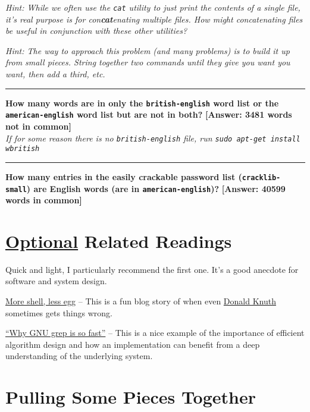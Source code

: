 \documentclass{article}
\begin{document}
\medskip
\noindent
\emph{\small Hint: While we often use the \texttt{cat} utility to just print
  the contents of a single file, it's real purpose is for con\textbf{cat}enating
  multiple files. How might concatenating files be useful in conjunction with
  these other utilities?
}

\medskip
\noindent
\emph{\small Hint: The way to approach this problem (and many problems) is to
  build it up from small pieces. String together two commands until they give
  you want you want, then add a third, etc.
}


\bigskip
\hrule
\smallskip
\noindent
\textbf{How many words are in only the \texttt{british-english} word list or
the \texttt{american-english} word list but are not in both?}
\hfill \textbf{[Answer: 3481 words not in common]}\\
\emph{\small If for some reason there is no \texttt{british-english} file, run
\texttt{sudo apt-get install wbritish}}
\vspace{3cm}

\hrule
\smallskip
\noindent
\textbf{How many entries in the easily crackable password list
  (\texttt{cracklib-small}) are English words (are in
\texttt{american-english})?}
\hfill \textbf{[Answer: 40599 words in common]}
\vspace{3cm}

\vfill
\section*{\ul{Optional} Related Readings}
Quick and light, I particularly recommend the first one. It's a good anecdote
for software and system design.

\medskip
\noindent
\href{http://www.leancrew.com/all-this/2011/12/more-shell-less-egg/}{More
shell, less egg} -- This is a fun blog story of when even
\href{https://en.wikipedia.org/wiki/Donald_Knuth}{Donald Knuth} sometimes gets
things wrong.

\medskip
\noindent
\href{https://lists.freebsd.org/pipermail/freebsd-current/2010-August/019310.html}{``Why GNU grep is so fast''} --
This is a nice example of the importance of efficient algorithm design and how
an implementation can benefit from a deep understanding of the underlying
system.




\newpage

\section{Pulling Some Pieces Together}
\end{document}

